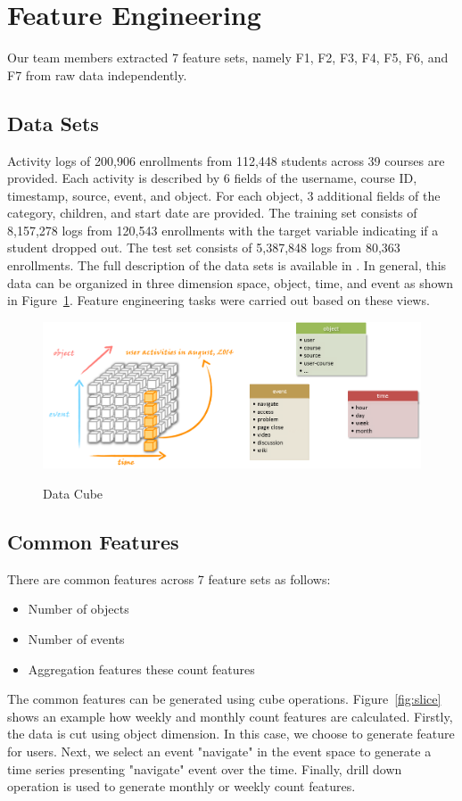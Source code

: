 \section{Feature Engineering}
Our team members extracted 7 feature sets, namely F1, F2, F3, F4, F5, F6, and F7 from raw data independently.

\subsection{Data Sets}
Activity logs of 200,906 enrollments from 112,448 students across 39 courses are provided.
Each activity is described by 6 fields of the username, course ID, timestamp, source, event, and object. 
For each object, 3 additional fields of the category, children, and start date are provided.
The training set consists of 8,157,278 logs from 120,543 enrollments with the target variable indicating if a student dropped out.  
The test set consists of 5,387,848 logs from 80,363 enrollments.
The full description of the data sets is available in \cite{kddcup2015_data}. In general, this data can be organized in three dimension space, object, time, and event as shown in Figure~\ref{fig:cube}. Feature engineering tasks were carried out based on these views.

\begin{figure}[!t]
	\caption{Data Cube}
	\centering
	\includegraphics[width=0.5 \textwidth]{cube}
	\label{fig:cube}
\end{figure}


\subsection{Common Features}
There are common features across 7 feature sets as follows:
\begin{itemize}
	\item Number of objects
	\item Number of events
	\item Aggregation features these count features
\end{itemize}
The common features can be generated using cube operations. Figure~\ref{fig:slice} shows an example how weekly and monthly count features are calculated. Firstly, the data is cut using object dimension. In this case, we choose to generate feature for users. Next, we select an event "navigate" in the event space to generate a time series presenting "navigate" event over the time. Finally, drill down operation is used to generate monthly or weekly count features.


